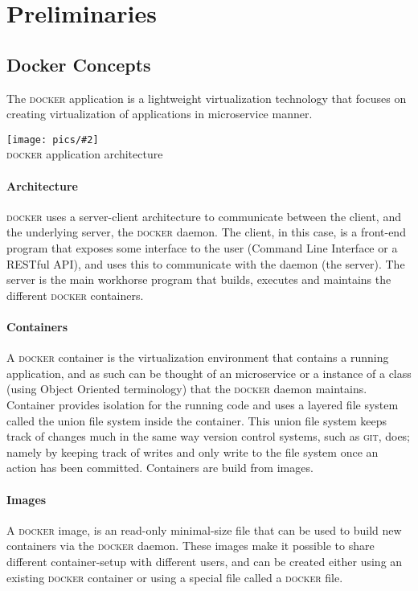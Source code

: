 \documentclass[12pt]{article}
\newcommand{\img}[3] {
	\begin{center}
	\texttt{[image: pics/\#2]}\\
	{\small #3}
	\end{center}
}
\newcommand{\docker}[0] {\textsc{docker}}
\newcommand{\git} {\textsc{git}}
\begin{document}
\section{Preliminaries}

\subsection{Docker Concepts}

The \docker{} application is a lightweight virtualization technology that focuses on creating virtualization of applications in microservice manner.\cite{DBLP:journals/software/Anderson15}

\img{0.6}{arch}{\docker{} application architecture}

\paragraph{Architecture} \docker{} uses a server-client architecture to communicate between the client, and the underlying server, the \docker{} daemon. The client, in this case, is a front-end program that exposes some interface to the user (Command Line Interface or a RESTful API), and uses this to communicate with the daemon (the server). The server is the main workhorse program that builds, executes and maintains the different \docker{} containers.

\paragraph{Containers} A \docker{} container is the virtualization environment that contains a running application, and as such can be thought of an microservice or a instance of a class (using Object Oriented terminology) that the \docker{} daemon maintains. Container provides isolation for the running code and uses a layered file system called the union file system inside the container.\cite{DBLP:journals/software/Anderson15} This union file system keeps track of changes much in the same way version control systems, such as \git{}, does; namely by keeping track of writes and only write to the file system once an action has been committed. Containers are build from images.\cite{DockerTutorial} 

\paragraph{Images} A \docker{} image, is an read-only minimal-size file that can be used to build new containers via the \docker{} daemon. These images make it possible to share different container-setup with different users, and can be created either using an existing \docker{} container or using a special file called a \docker{} file. 
\end{document}
